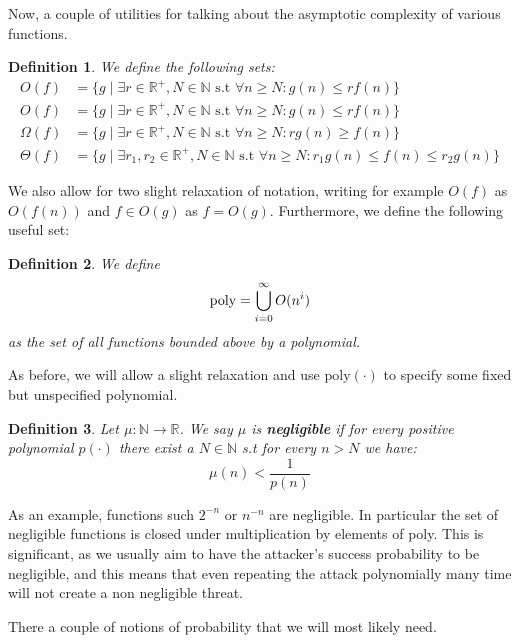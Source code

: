 \documentclass{article}
\newtheorem{definition}{Definition}
\begin{document}
Now, a couple of utilities for talking about the asymptotic complexity of various functions.

\begin{definition} We define the following sets:
\begin{align*}
    O(f) &= \{ g \mid \exists r \in \mathbb{R}^+, N \in \mathbb{N} \text{ s.t } \forall n \geq N : g(n) \leq r f(n)  \} \\
    O(f) &= \{ g \mid \exists r \in \mathbb{R}^+, N \in \mathbb{N} \text{ s.t } \forall n \geq N : g(n) \leq r f(n)  \} \\
    \Omega(f) &= \{ g \mid \exists r \in \mathbb{R}^+, N \in \mathbb{N} \text{ s.t } \forall n \geq N : r g(n) \geq f(n)  \} \\
    \Theta(f) &= \{ g \mid \exists r_1,r_2 \in \mathbb{R}^+, N \in \mathbb{N} \text{ s.t } \forall n \geq N : r_1 g(n) \leq f(n) \leq r_2 g(n)  \}
\end{align*}
\end{definition}
We also allow for two slight relaxation of notation, writing for example $O(f)$ as $O(f(n))$ and $f \in O(g)$ as $f = O(g)$. Furthermore, we define the following useful set:
\begin{definition} We define
\[\text{\normalfont{poly}} = \bigcup_{i = 0}^\infty O(n^i)\]
as the set of all functions bounded above by a polynomial. 
\end{definition}
As before, we will allow a slight relaxation and use $\text{poly}(\cdot)$ to specify some fixed but unspecified polynomial.

\begin{definition}
Let $\mu : \mathbb{N} \to \mathbb{R}$. We say $\mu$ is \textbf{negligible} if for every positive polynomial $p(\cdot)$ there exist a $N \in \mathbb{N}$ s.t for every $n > N$ we have:
\[\mu(n) < \frac{1}{p(n)}\]
\end{definition}
As an example, functions such $2^{-n}$ or $n^{-n}$ are negligible. In particular the set of negligible functions is closed under multiplication by elements of poly. This is significant, as we usually aim to have the attacker's success probability to be negligible, and this means that even repeating the attack polynomially many time will not create a non negligible threat. \par

There a couple of notions of probability that we will most likely need.
\end{document}
